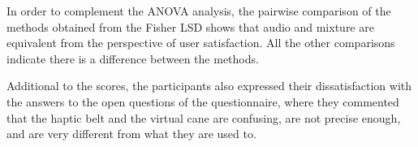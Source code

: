

In order to complement the ANOVA analysis, the pairwise comparison of the methods obtained from the Fisher LSD shows that audio and mixture are equivalent from the perspective of user satisfaction. All the other comparisons indicate there is a difference between the methods.

Additional to the scores, the participants also expressed their dissatisfaction with the answers to the open questions of the questionnaire, where they commented that the haptic belt and the virtual cane are confusing, are not precise enough, and are very different from what they are used to.